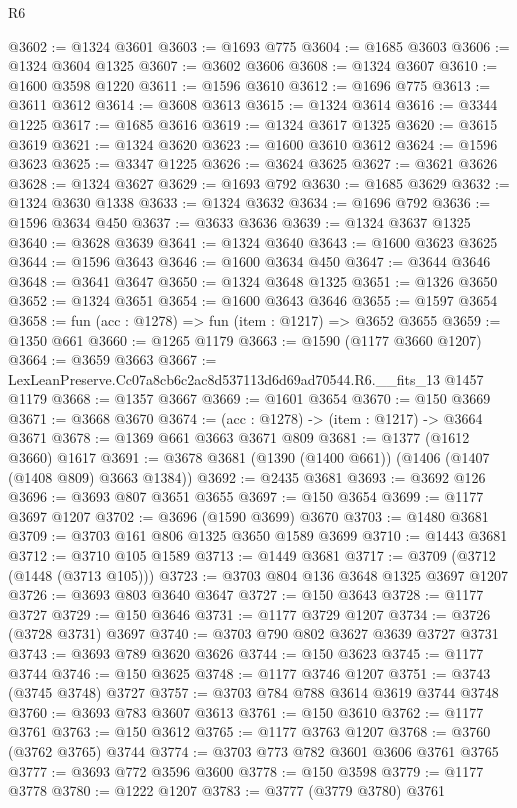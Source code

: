 \begin{lexlean}{R6}
\begin{coremodule}
@3602 := @1324 @3601
@3603 := @1693 @775
@3604 := @1685 @3603
@3606 := @1324 @3604 @1325
@3607 := @3602 @3606
@3608 := @1324 @3607
@3610 := @1600 @3598 @1220
@3611 := @1596 @3610
@3612 := @1696 @775
@3613 := @3611 @3612
@3614 := @3608 @3613
@3615 := @1324 @3614
@3616 := @3344 @1225
@3617 := @1685 @3616
@3619 := @1324 @3617 @1325
@3620 := @3615 @3619
@3621 := @1324 @3620
@3623 := @1600 @3610 @3612
@3624 := @1596 @3623
@3625 := @3347 @1225
@3626 := @3624 @3625
@3627 := @3621 @3626
@3628 := @1324 @3627
@3629 := @1693 @792
@3630 := @1685 @3629
@3632 := @1324 @3630 @1338
@3633 := @1324 @3632
@3634 := @1696 @792
@3636 := @1596 @3634 @450
@3637 := @3633 @3636
@3639 := @1324 @3637 @1325
@3640 := @3628 @3639
@3641 := @1324 @3640
@3643 := @1600 @3623 @3625
@3644 := @1596 @3643
@3646 := @1600 @3634 @450
@3647 := @3644 @3646
@3648 := @3641 @3647
@3650 := @1324 @3648 @1325
@3651 := @1326 @3650
@3652 := @1324 @3651
@3654 := @1600 @3643 @3646
@3655 := @1597 @3654
@3658 := fun (acc : @1278) => fun (item : @1217) => @3652 @3655
@3659 := @1350 @661
@3660 := @1265 @1179
@3663 := @1590 (@1177 @3660 @1207)
@3664 := @3659 @3663
@3667 := LexLeanPreserve.Cc07a8cb6c2ac8d537113d6d69ad70544.R6.__fits_13 @1457 @1179
@3668 := @1357 @3667
@3669 := @1601 @3654
@3670 := @150 @3669
@3671 := @3668 @3670
@3674 := (acc : @1278) -> (item : @1217) -> @3664 @3671
@3678 := @1369 @661 @3663 @3671 @809
@3681 := @1377 (@1612 @3660) @1617
@3691 := @3678 @3681 (@1390 (@1400 @661)) (@1406 (@1407 (@1408 @809) @3663 @1384))
@3692 := @2435 @3681
@3693 := @3692 @126
@3696 := @3693 @807 @3651 @3655
@3697 := @150 @3654
@3699 := @1177 @3697 @1207
@3702 := @3696 (@1590 @3699) @3670
@3703 := @1480 @3681
@3709 := @3703 @161 @806 @1325 @3650 @1589 @3699
@3710 := @1443 @3681
@3712 := @3710 @105 @1589
@3713 := @1449 @3681
@3717 := @3709 (@3712 (@1448 (@3713 @105)))
@3723 := @3703 @804 @136 @3648 @1325 @3697 @1207
@3726 := @3693 @803 @3640 @3647
@3727 := @150 @3643
@3728 := @1177 @3727
@3729 := @150 @3646
@3731 := @1177 @3729 @1207
@3734 := @3726 (@3728 @3731) @3697
@3740 := @3703 @790 @802 @3627 @3639 @3727 @3731
@3743 := @3693 @789 @3620 @3626
@3744 := @150 @3623
@3745 := @1177 @3744
@3746 := @150 @3625
@3748 := @1177 @3746 @1207
@3751 := @3743 (@3745 @3748) @3727
@3757 := @3703 @784 @788 @3614 @3619 @3744 @3748
@3760 := @3693 @783 @3607 @3613
@3761 := @150 @3610
@3762 := @1177 @3761
@3763 := @150 @3612
@3765 := @1177 @3763 @1207
@3768 := @3760 (@3762 @3765) @3744
@3774 := @3703 @773 @782 @3601 @3606 @3761 @3765
@3777 := @3693 @772 @3596 @3600
@3778 := @150 @3598
@3779 := @1177 @3778
@3780 := @1222 @1207
@3783 := @3777 (@3779 @3780) @3761

\end{coremodule}
\end{lexlean}
